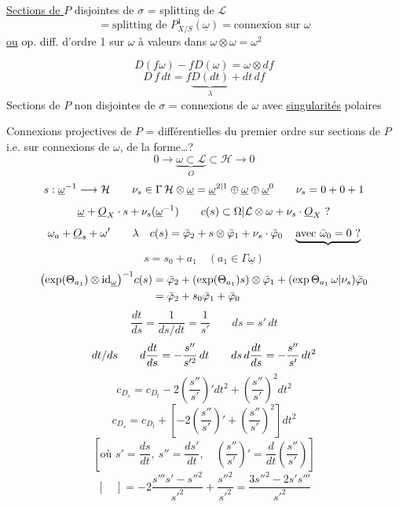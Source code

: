 \uline{Sections de $P$} disjointes de $\sigma$ = splitting de $\mathcal L$
\[
=\text{splitting de }P^1_{X/S}(\underline\omega)
=\text{connexion sur }\omega
\]
\uline{ou} op. diff. d'ordre 1 sur $\omega$ à valeurs dans $\omega\otimes\omega=\omega^2$

\[
D(f\omega)-fD(\omega)=\omega\otimes df
\]
\[
D\,f\,dt=f\underbrace{D(dt)}_{\lambda}+dt\,df
\]
Sections de $P$ non disjointes de $\sigma$ = connexions de $\omega$ avec  \uline{singularités} polaires

Connexions projectives de $P$ =  différentielles du premier ordre sur sections de $P$ i.e. sur connexions de $\omega$, de la forme\ldots ?
\[
0\longrightarrow\underbrace{\omega\subset\mathcal L}_{O}\subset\mathcal H\longrightarrow0
\]
\[
s:\underline\omega^{-1}\longrightarrow\mathcal H
\qquad
\nu_s\in\Gamma\,\mathcal H\otimes\underline\omega
=\underline\omega^{{2|1}}\oplus\underline\omega\oplus\underline\omega^0
\qquad{\nu_s}=0+0+1
\]
\[
\underline\omega+\underline O_X\cdot s+\nu_s(\underline\omega^{-1})
\qquad c(s)\subset{\Omega|\mathcal L}\otimes\omega+\nu_s\cdot\underline O_X\ ?
\]
\[
\omega_{{a}}+\underline O_s+\omega'
\qquad {{\lambda}}\quad
c(s)=\bar\varphi_2+s\otimes\bar\varphi_1+\nu_s\cdot\bar\varphi_0
\quad\underbrace{\text{avec }{\bar\omega_0}=0\ ?}
\]
\[
s=s_0+a_1\quad(a_1\in\Gamma\underline\omega)
\]
\[
\begin{aligned}
\bigl(\exp(\Theta_{a_1})\otimes\mathrm{id}_{\underline\omega}\bigr)^{{-1}}c(s)
&=\bar\varphi_2+(\exp(\Theta_{a_1})s)\otimes\bar\varphi_1
 +(\exp\Theta_{a_1}\,{\omega|\nu_s}){\bar\varphi_0}\\
&=\bar\varphi_2+s_0\bar\varphi_1+\bar\varphi_0
\end{aligned}
\]
\[
\frac{dt}{ds}=\frac1{ds/dt}=\frac1{s'}\qquad ds=s'\,dt
\]
\[
{{dt/ds}}\qquad d\frac{dt}{ds}=-\frac{s''}{s'^2}\,dt
\qquad ds\,d\frac{dt}{ds}=-\frac{s''}{s'}\,dt^2
\]
\[
c_{D_s}=c_{D_t}-2\left(\frac{s''}{s'}\right)'dt^2+\left(\frac{s''}{s'}\right)^2dt^2
\]
\[
\boxed{c_{D_s}=c_{D_t}+\left[-2\left(\frac{s''}{s'}\right)'+\left(\frac{s''}{s'}\right)^2\right]dt^2}
\]
\[
\left[\text{où }s'=\frac{ds}{dt},\ s''=\frac{ds'}{dt},\quad
\left(\frac{s''}{s'}\right)'=\frac d{dt}\left(\frac{s''}{s'}\right)\right]
\]
\[
[\quad]=-2\frac{s'''s'-s''^2}{s'^2}+\frac{s''^2}{s'^2}
=\frac{3s''^2-2s's'''}{s'^2}
\]
